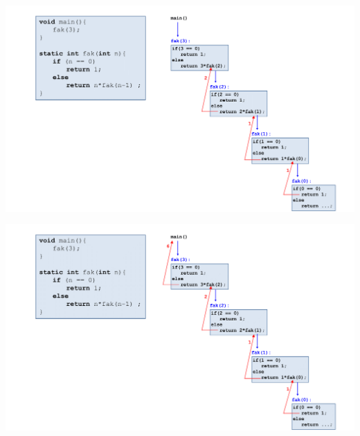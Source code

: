 \documentclass{beamer}
\begin{document}
\begin{frame}
    \begin{center}
           \includegraphics[width=1.1\textwidth]{rekursion anlage/07_Rekursion-10.png}
    \end{center}
\end{frame}
\begin{frame}
    \begin{center}
           \includegraphics[width=1.1\textwidth]{rekursion anlage/07_Rekursion-11.png}
    \end{center}
\end{frame}
\end{document}
